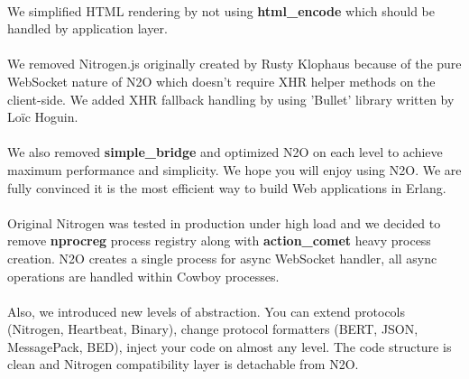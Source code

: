 \paragraph{}
We simplified HTML rendering by not using
{\bf html\_encode} which should be handled by application layer.

\paragraph{}
We removed Nitrogen.js originally created by Rusty Klophaus
because of the pure WebSocket nature of N2O which doesn't
require XHR helper methods on the client-side. We added XHR fallback
handling by using 'Bullet' library written by Loïc Hoguin.

\paragraph{}
We also removed {\bf simple\_bridge} and optimized N2O on each level to
achieve maximum performance and simplicity. We hope you will enjoy
using N2O. We are fully convinced it is the most efficient way to
build Web applications in Erlang.

\paragraph{}
Original Nitrogen was tested in production under high load and we
decided to remove {\bf nprocreg} process registry along 
with {\bf{action\_comet}} heavy process creation. N2O creates a single
process for async WebSocket handler, all async operations
are handled within Cowboy processes.

\paragraph{}
Also, we introduced new levels of abstraction. You can extend
protocols (Nitrogen, Heartbeat, Binary), change protocol formatters (BERT,
JSON, MessagePack, BED), inject your code on almost any level. The code structure
is clean and Nitrogen compatibility layer is detachable from N2O.
